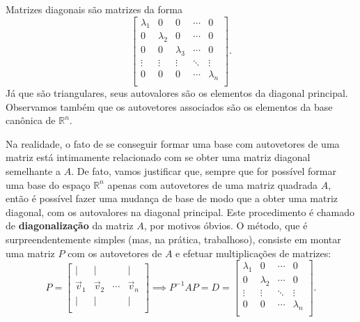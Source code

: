 Matrizes diagonais são matrizes da forma
\begin{equation}
\begin{bmatrix}
\lambda_1 & 0 & 0 & \cdots & 0 \\
0 & \lambda_2 & 0 & \cdots & 0 \\
0 & 0 & \lambda_3 & \cdots & 0 \\
\vdots & \vdots & \vdots & \ddots & \vdots \\
0 & 0 & 0 & \cdots & \lambda_n \\
\end{bmatrix}.
\end{equation} Já que são triangulares, seus autovalores são os elementos da diagonal principal. Observamos também que os autovetores associados são os elementos da base canônica de $\mathbb{R}^n$.

Na realidade, o fato de se conseguir formar uma base com autovetores de uma matriz está intimamente relacionado com se obter uma matriz diagonal semelhante a $A$. De fato, vamos justificar que, sempre que for possível formar uma base do espaço $\mathbb{R}^n$ apenas com autovetores de uma matriz quadrada $A$, então é possível fazer uma mudança de base de modo que a obter uma matriz diagonal, com os autovalores na diagonal principal. Este procedimento é chamado de \textbf{diagonalização} da matriz $A$, por motivos óbvios. O método, que é surpreendentemente simples (mas, na prática, trabalhoso), consiste em montar uma matriz $P$ com os autovetores de $A$ e efetuar multiplicações de matrizes:
\begin{equation}
P = \begin{bmatrix}
| & | &  & | \\
\vec{v}_1 & \vec{v}_2 & \cdots & \vec{v}_n \\
| & | &  & |\\
\end{bmatrix} \implies P^{-1} A P = D = \begin{bmatrix}
\lambda_1 & 0  & \cdots & 0 \\
0 & \lambda_2  & \cdots & 0 \\
\vdots & \vdots & \ddots & \vdots \\
0 & 0 & \cdots & \lambda_n \\
\end{bmatrix}.
\end{equation}

